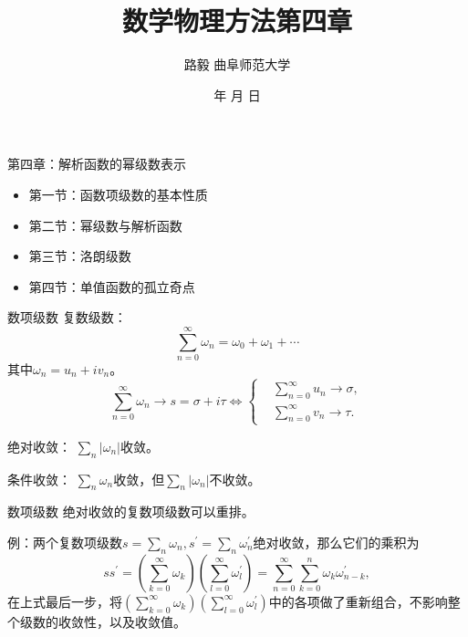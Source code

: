 \documentclass[11pt]{beamer}
\newcommand{\kong}[1][0.5]{\vspace{#1cm}}
\begin{document}
	\author{ 路毅 \hspace{0.3cm} 曲阜师范大学 }
	\date{\number\year 年 \number\month 月 \number\day 日}
	\title{数学物理方法第四章}

\begin{frame}
	\maketitle
\end{frame}

\kaishu

\begin{frame}{第四章：解析函数的幂级数表示}
\begin{itemize}
	\item 第一节：函数项级数的基本性质
	\vspace{1cm}
	\item 第二节：幂级数与解析函数
	\vspace{1cm}
	\item 第三节：洛朗级数
	\vspace{1cm}
	\item 第四节：单值函数的孤立奇点
\end{itemize}
\end{frame}

\begin{frame}{数项级数}
复数级数：
\begin{equation}
\sum^\infty_{n=0} \omega_n = \omega_0 + \omega_1 + \cdots
\end{equation}
其中$\omega_n = u_n + i v_n$。
\begin{equation}
\sum_{n=0}^{\infty}\omega_n \rightarrow s= \sigma + i \tau
\Leftrightarrow \left\{
\begin{aligned}
& \sum_{n=0}^{\infty} u_n \rightarrow \sigma, \\
& \sum_{n=0}^{\infty} v_n \rightarrow \tau.
\end{aligned}
\right.
\end{equation}

\kong[0.5]
绝对收敛： $\sum_n |\omega_n| $收敛。

\kong[0.5]
条件收敛： $\sum_n \omega_n $收敛，但$\sum_n |\omega_n| $不收敛。
\end{frame}

\begin{frame}{数项级数}
\kong[0.5]
绝对收敛的复数项级数可以重排。

\kong[0.5]
例：两个复数项级数$s=\sum_n \omega_n, s^\prime=\sum_n \omega^\prime_n$绝对收敛，那么它们的乘积为
\begin{equation}
s s^\prime = (\sum^\infty_{k=0} \omega_k) ( \sum^\infty_{l=0} \omega^\prime_l) = \sum^\infty_{n=0} \sum^n_{k=0} \omega_k \omega^\prime_{n-k},
\end{equation}
在上式最后一步，将$(\sum^\infty_{k=0} \omega_k) ( \sum^\infty_{l=0} \omega^\prime_l)$中的各项做了重新组合，不影响整个级数的收敛性，以及收敛值。
\end{frame}
\end{document}

